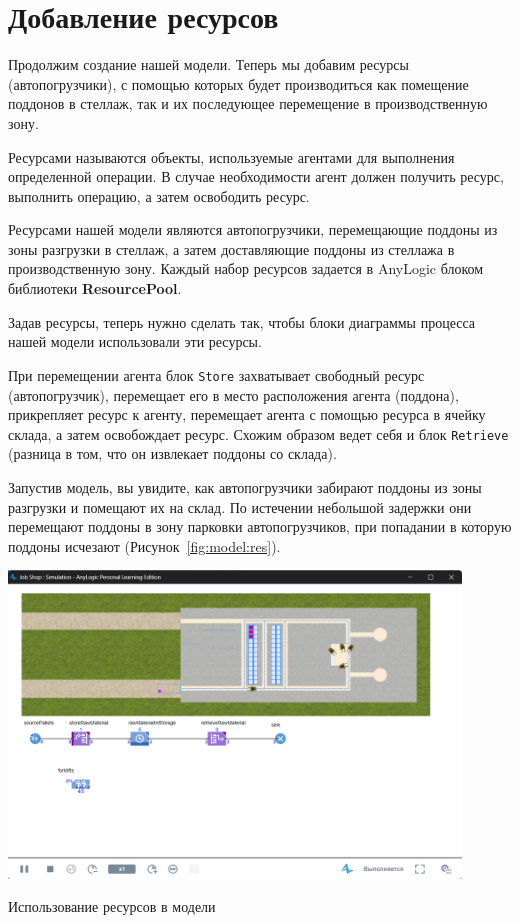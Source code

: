 \section{Добавление ресурсов}
Продолжим создание нашей модели. Теперь мы добавим ресурсы
(автопогрузчики), с помощью которых будет производиться как помещение
поддонов в стеллаж, так и их последующее перемещение в производственную
зону.\par
Ресурсами называются объекты, используемые агентами для выполнения
определенной операции. В случае необходимости агент должен получить
ресурс, выполнить операцию, а затем освободить ресурс.\par
Ресурсами нашей модели являются автопогрузчики, перемещающие поддоны из
зоны разгрузки в стеллаж, а затем доставляющие поддоны из стеллажа в
производственную зону.
Каждый набор ресурсов задается в AnyLogic блоком библиотеки
\textbf{ResourcePool}.\par
Задав ресурсы, теперь нужно сделать так, чтобы блоки диаграммы
процесса нашей модели использовали эти ресурсы.\par
При перемещении агента блок \texttt{Store} захватывает свободный ресурс
(автопогрузчик), перемещает его в место расположения агента (поддона),
прикрепляет ресурс к агенту, перемещает агента с помощью ресурса в ячейку
склада, а затем освобождает ресурс. Схожим образом ведет себя и блок
\texttt{Retrieve} (разница в том, что он извлекает поддоны со склада).\par
Запустив модель, вы увидите, как автопогрузчики забирают поддоны из зоны
разгрузки и помещают их на склад. По истечении небольшой задержки они
перемещают поддоны в зону парковки автопогрузчиков, при попадании
в которую поддоны исчезают (Рисунок~\ref{fig:model:res}).

\begin{image}
	\includegraphics[width=0.9\textwidth]{2023-04-02_14-57-12}
	\caption{Использование ресурсов в модели}
	\label{fig:model:res}
\end{image}

